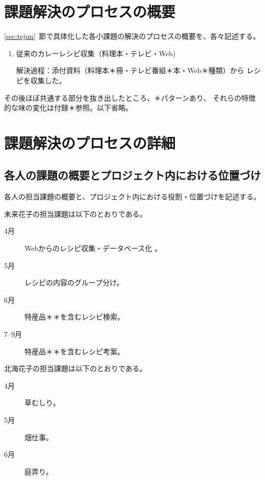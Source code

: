 \documentclass[openany,11pt,papersize]{jsbook}
\begin{document}
\chapter{課題解決のプロセスの概要}
\begin{hissu}
\ref{sec:tejun}~節で具体化した各小課題の解決のプロセスの概要を、各々記述する。
\end{hissu}

\begin{enumerate}
 \item 従来のカレーレシピ収集（料理本・テレビ・Web) 
\par 解決過程：添付資料（料理本＊冊・テレビ番組＊本・Web＊種類）から
     レシピを収集した。 
\end{enumerate}


その後ほぼ共通する部分を抜き出したところ、＊パターンあり、
それらの特徴的な味の変化は付録＊参照。以下省略。




\chapter{課題解決のプロセスの詳細}

\section{各人の課題の概要とプロジェクト内における位置づけ}
\begin{hissu}
各人の担当課題の概要と、プロジェクト内における役割・位置づけを記述する。
\end{hissu}

未来花子の担当課題は以下のとおりである。 
\begin{description}
 \item[4月] Webからのレシピ収集・データベース化 。
 \item[5月] レシピの内容のグループ分け。
 \item[6月] 特産品＊＊を含むレシピ検索。
 \item[7--9月]特産品＊＊を含むレシピ考案。
\end{description}

北海花子の担当課題は以下のとおりである。 
\begin{description}
 \item[4月] 草むしり。
 \item[5月] 畑仕事。
 \item[6月] 庭弄り。
\end{description}
\end{document}

